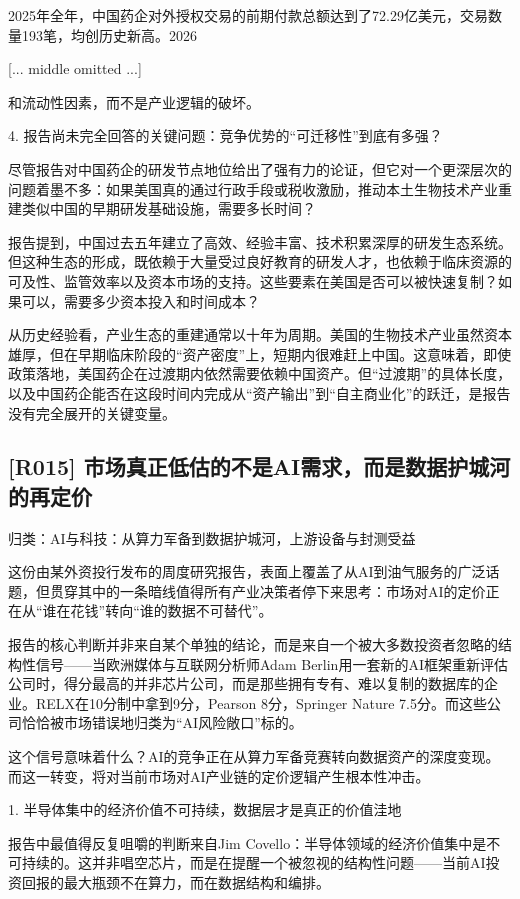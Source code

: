 \documentclass[11pt]{ctexart}
\begin{document}
2025年全年，中国药企对外授权交易的前期付款总额达到了72.29亿美元，交易数量193笔，均创历史新高。2026

[... middle omitted ...]

和流动性因素，而不是产业逻辑的破坏。

4. 报告尚未完全回答的关键问题：竞争优势的“可迁移性”到底有多强？

尽管报告对中国药企的研发节点地位给出了强有力的论证，但它对一个更深层次的问题着墨不多：如果美国真的通过行政手段或税收激励，推动本土生物技术产业重建类似中国的早期研发基础设施，需要多长时间？

报告提到，中国过去五年建立了高效、经验丰富、技术积累深厚的研发生态系统。但这种生态的形成，既依赖于大量受过良好教育的研发人才，也依赖于临床资源的可及性、监管效率以及资本市场的支持。这些要素在美国是否可以被快速复制？如果可以，需要多少资本投入和时间成本？

从历史经验看，产业生态的重建通常以十年为周期。美国的生物技术产业虽然资本雄厚，但在早期临床阶段的“资产密度”上，短期内很难赶上中国。这意味着，即使政策落地，美国药企在过渡期内依然需要依赖中国资产。但“过渡期”的具体长度，以及中国药企能否在这段时间内完成从“资产输出”到“自主商业化”的跃迁，是报告没有完全展开的关键变量。

\subsection{[R015] 市场真正低估的不是AI需求，而是数据护城河的再定价}
{\small\color{refgray}归类：AI与科技：从算力军备到数据护城河，上游设备与封测受益}

这份由某外资投行发布的周度研究报告，表面上覆盖了从AI到油气服务的广泛话题，但贯穿其中的一条暗线值得所有产业决策者停下来思考：市场对AI的定价正在从“谁在花钱”转向“谁的数据不可替代”。

报告的核心判断并非来自某个单独的结论，而是来自一个被大多数投资者忽略的结构性信号——当欧洲媒体与互联网分析师Adam Berlin用一套新的AI框架重新评估公司时，得分最高的并非芯片公司，而是那些拥有专有、难以复制的数据库的企业。RELX在10分制中拿到9分，Pearson 8分，Springer Nature 7.5分。而这些公司恰恰被市场错误地归类为“AI风险敞口”标的。

这个信号意味着什么？AI的竞争正在从算力军备竞赛转向数据资产的深度变现。而这一转变，将对当前市场对AI产业链的定价逻辑产生根本性冲击。

1. 半导体集中的经济价值不可持续，数据层才是真正的价值洼地

报告中最值得反复咀嚼的判断来自Jim Covello：半导体领域的经济价值集中是不可持续的。这并非唱空芯片，而是在提醒一个被忽视的结构性问题——当前AI投资回报的最大瓶颈不在算力，而在数据结构和编排。
\end{document}
